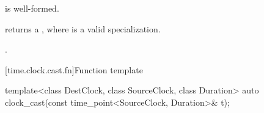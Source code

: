 \begin{itemdescr}
\pnum
\constraints
{} is well-formed.

\pnum
\mandates
{} returns a ,
where  is a valid  specialization.

\pnum
\returns
{}.
\end{itemdescr}

[time.clock.cast.fn]{Function template }

%
\begin{itemdecl}
template<class DestClock, class SourceClock, class Duration>
  auto clock_cast(const time_point<SourceClock, Duration>& t);
\end{itemdecl}

